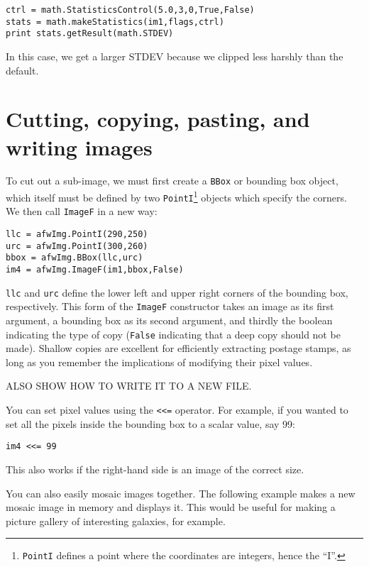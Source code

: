 \documentclass{book}
\begin{document}
\begin{verbatim}
ctrl = math.StatisticsControl(5.0,3,0,True,False)
stats = math.makeStatistics(im1,flags,ctrl)
print stats.getResult(math.STDEV) 
\end{verbatim}

In this case, we get a larger STDEV because we clipped less harshly
than the default.


\section{Cutting, copying, pasting, and writing images}

To cut out a sub-image, we must first create a \texttt{BBox} or
bounding box object, which itself must be defined by two
\texttt{PointI}\footnote{\texttt{PointI} defines a point where the
 coordinates are integers, hence the ``I''.}  objects which specify
the corners.  We then call \texttt{ImageF} in a new way:

\begin{verbatim}
llc = afwImg.PointI(290,250)
urc = afwImg.PointI(300,260)
bbox = afwImg.BBox(llc,urc)
im4 = afwImg.ImageF(im1,bbox,False)
\end{verbatim}

\texttt{llc} and \texttt{urc} define the lower left and upper right
corners of the bounding box, respectively.  This form of the
\texttt{ImageF} constructor takes an image as its first argument, a
bounding box as its second argument, and thirdly the boolean
indicating the type of copy (\texttt{False} indicating that a deep
copy should not be made).  Shallow copies are excellent for
efficiently extracting postage stamps, as long as you remember the
implications of modifying their pixel values.

ALSO SHOW HOW TO WRITE IT TO A NEW FILE.

You can set pixel values using the \texttt{<<=} operator.  For
example, if you wanted to set all the pixels inside the bounding box to a
scalar value, say 99:

\begin{verbatim}
im4 <<= 99
\end{verbatim}

This also works if the right-hand side is an image of the correct size.

You can also easily mosaic images together.  The following example
makes a new mosaic image in memory and displays it.  This would be
useful for making a picture gallery of interesting galaxies, for
example.
\end{document}
